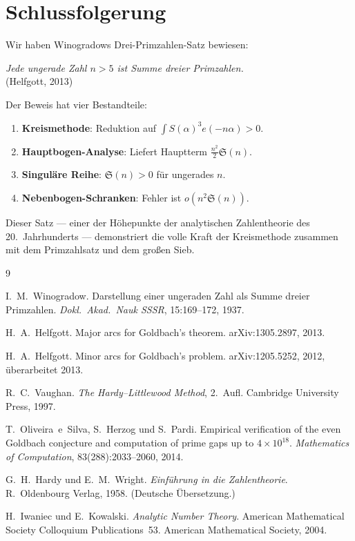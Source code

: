 \documentclass[12pt,a4paper]{amsart}
\theoremstyle{definition}
\newcommand{\eq}[1]{e\!\left(#1\right)}
\begin{document}
\section{Schlussfolgerung}

Wir haben Winogradows Drei-Primzahlen-Satz bewiesen:

\begin{center}
\textit{Jede ungerade Zahl $n > 5$ ist Summe dreier Primzahlen.}\\
\small (Helfgott, 2013)
\end{center}

Der Beweis hat vier Bestandteile:
\begin{enumerate}
  \item \textbf{Kreismethode}: Reduktion auf $\int S(\alpha)^3 \eq{-n\alpha} > 0$.
  \item \textbf{Hauptbogen-Analyse}: Liefert Hauptterm $\frac{n^2}{2}\mathfrak{S}(n)$.
  \item \textbf{Singuläre Reihe}: $\mathfrak{S}(n) > 0$ für ungerades $n$.
  \item \textbf{Nebenbogen-Schranken}: Fehler ist $o(n^2 \mathfrak{S}(n))$.
\end{enumerate}

Dieser Satz — einer der Höhepunkte der analytischen Zahlentheorie des
20.~Jahrhunderts — demonstriert die volle Kraft der Kreismethode
zusammen mit dem Primzahlsatz und dem großen Sieb.

\begin{thebibliography}{9}

I.~M.~Winogradow.
\newblock Darstellung einer ungeraden Zahl als Summe dreier Primzahlen.
\newblock \emph{Dokl.\ Akad.\ Nauk SSSR}, 15:169--172, 1937.

H.~A.~Helfgott.
\newblock Major arcs for Goldbach's theorem.
\newblock arXiv:1305.2897, 2013.

H.~A.~Helfgott.
\newblock Minor arcs for Goldbach's problem.
\newblock arXiv:1205.5252, 2012, überarbeitet 2013.

R.~C.~Vaughan.
\newblock \emph{The Hardy--Littlewood Method}, 2.~Aufl.
\newblock Cambridge University Press, 1997.

T.~Oliveira~e~Silva, S.~Herzog und S.~Pardi.
\newblock Empirical verification of the even Goldbach conjecture and computation
  of prime gaps up to $4 \times 10^{18}$.
\newblock \emph{Mathematics of Computation}, 83(288):2033--2060, 2014.

G.~H.~Hardy und E.~M.~Wright.
\newblock \emph{Einführung in die Zahlentheorie}.
\newblock R.~Oldenbourg Verlag, 1958. (Deutsche Übersetzung.)

H.~Iwaniec und E.~Kowalski.
\newblock \emph{Analytic Number Theory}.
\newblock American Mathematical Society Colloquium Publications~53.
\newblock American Mathematical Society, 2004.

\end{thebibliography}
\end{document}

